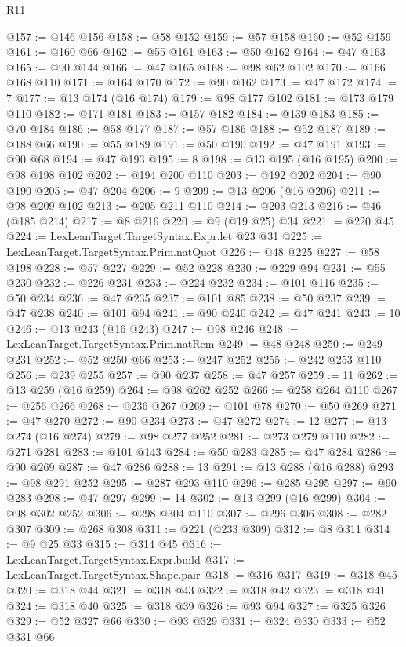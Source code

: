 \begin{lexlean}{R11}
\begin{coremodule}
@157 := @146 @156
@158 := @58 @152
@159 := @57 @158
@160 := @52 @159
@161 := @160 @66
@162 := @55 @161
@163 := @50 @162
@164 := @47 @163
@165 := @90 @144
@166 := @47 @165
@168 := @98 @62 @102
@170 := @166 @168 @110
@171 := @164 @170
@172 := @90 @162
@173 := @47 @172
@174 := 7
@177 := @13 @174 (@16 @174)
@179 := @98 @177 @102
@181 := @173 @179 @110
@182 := @171 @181
@183 := @157 @182
@184 := @139 @183
@185 := @70 @184
@186 := @58 @177
@187 := @57 @186
@188 := @52 @187
@189 := @188 @66
@190 := @55 @189
@191 := @50 @190
@192 := @47 @191
@193 := @90 @68
@194 := @47 @193
@195 := 8
@198 := @13 @195 (@16 @195)
@200 := @98 @198 @102
@202 := @194 @200 @110
@203 := @192 @202
@204 := @90 @190
@205 := @47 @204
@206 := 9
@209 := @13 @206 (@16 @206)
@211 := @98 @209 @102
@213 := @205 @211 @110
@214 := @203 @213
@216 := @46 (@185 @214)
@217 := @8 @216
@220 := @9 (@19 @25) @34
@221 := @220 @45
@224 := LexLeanTarget.TargetSyntax.Expr.let @23 @31
@225 := LexLeanTarget.TargetSyntax.Prim.natQuot
@226 := @48 @225
@227 := @58 @198
@228 := @57 @227
@229 := @52 @228
@230 := @229 @94
@231 := @55 @230
@232 := @226 @231
@233 := @224 @232
@234 := @101 @116
@235 := @50 @234
@236 := @47 @235
@237 := @101 @85
@238 := @50 @237
@239 := @47 @238
@240 := @101 @94
@241 := @90 @240
@242 := @47 @241
@243 := 10
@246 := @13 @243 (@16 @243)
@247 := @98 @246
@248 := LexLeanTarget.TargetSyntax.Prim.natRem
@249 := @48 @248
@250 := @249 @231
@252 := @52 @250 @66
@253 := @247 @252
@255 := @242 @253 @110
@256 := @239 @255
@257 := @90 @237
@258 := @47 @257
@259 := 11
@262 := @13 @259 (@16 @259)
@264 := @98 @262 @252
@266 := @258 @264 @110
@267 := @256 @266
@268 := @236 @267
@269 := @101 @78
@270 := @50 @269
@271 := @47 @270
@272 := @90 @234
@273 := @47 @272
@274 := 12
@277 := @13 @274 (@16 @274)
@279 := @98 @277 @252
@281 := @273 @279 @110
@282 := @271 @281
@283 := @101 @143
@284 := @50 @283
@285 := @47 @284
@286 := @90 @269
@287 := @47 @286
@288 := 13
@291 := @13 @288 (@16 @288)
@293 := @98 @291 @252
@295 := @287 @293 @110
@296 := @285 @295
@297 := @90 @283
@298 := @47 @297
@299 := 14
@302 := @13 @299 (@16 @299)
@304 := @98 @302 @252
@306 := @298 @304 @110
@307 := @296 @306
@308 := @282 @307
@309 := @268 @308
@311 := @221 (@233 @309)
@312 := @8 @311
@314 := @9 @25 @33
@315 := @314 @45
@316 := LexLeanTarget.TargetSyntax.Expr.build
@317 := LexLeanTarget.TargetSyntax.Shape.pair
@318 := @316 @317
@319 := @318 @45
@320 := @318 @44
@321 := @318 @43
@322 := @318 @42
@323 := @318 @41
@324 := @318 @40
@325 := @318 @39
@326 := @93 @94
@327 := @325 @326
@329 := @52 @327 @66
@330 := @93 @329
@331 := @324 @330
@333 := @52 @331 @66

\end{coremodule}
\end{lexlean}
